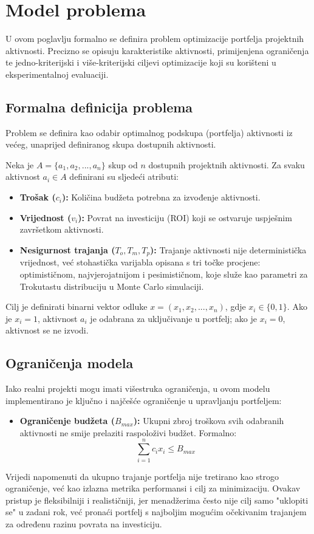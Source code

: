 \section{Model problema}
U ovom poglavlju formalno se definira problem optimizacije portfelja projektnih aktivnosti. Precizno se opisuju karakteristike aktivnosti, primijenjena ograničenja te jedno-kriterijski i više-kriterijski ciljevi optimizacije koji su korišteni u eksperimentalnoj evaluaciji.

\subsection{Formalna definicija problema}
Problem se definira kao odabir optimalnog podskupa (portfelja) aktivnosti iz većeg, unaprijed definiranog skupa dostupnih aktivnosti.

Neka je $A=\{a_1, a_2, ..., a_n\}$ skup od $n$ dostupnih projektnih aktivnosti. Za svaku aktivnost $a_i \in A$ definirani su sljedeći atributi:
\begin{itemize}
    \item \textbf{Trošak ($c_i$):} Količina budžeta potrebna za izvođenje aktivnosti.
    \item \textbf{Vrijednost ($v_i$):} Povrat na investiciju (ROI) koji se ostvaruje uspješnim završetkom aktivnosti.
    \item \textbf{Nesigurnost trajanja ($T_o, T_m, T_p$):} Trajanje aktivnosti nije deterministička vrijednost, već stohastička varijabla opisana s tri točke procjene: optimističnom, najvjerojatnijom i pesimističnom, koje služe kao parametri za Trokutastu distribuciju u Monte Carlo simulaciji.
\end{itemize}
Cilj je definirati binarni vektor odluke $x=(x_1, x_2, ..., x_n)$, gdje $x_i \in \{0,1\}$. Ako je $x_i=1$, aktivnost $a_i$ je odabrana za uključivanje u portfelj; ako je $x_i=0$, aktivnost se ne izvodi.

\subsection{Ograničenja modela}
Iako realni projekti mogu imati višestruka ograničenja, u ovom modelu implementirano je ključno i najčešće ograničenje u upravljanju portfeljem:
\begin{itemize}
    \item \textbf{Ograničenje budžeta ($B_{max}$):} Ukupni zbroj troškova svih odabranih aktivnosti ne smije prelaziti raspoloživi budžet. Formalno:
    $$ \sum_{i=1}^n c_i x_i \leq B_{max} $$
\end{itemize}
Vrijedi napomenuti da ukupno trajanje portfelja nije tretirano kao strogo ograničenje, već kao izlazna metrika performansi i cilj za minimizaciju. Ovakav pristup je fleksibilniji i realističniji, jer menadžerima često nije cilj samo "uklopiti se" u zadani rok, već pronaći portfelj s najboljim mogućim očekivanim trajanjem za određenu razinu povrata na investiciju.

